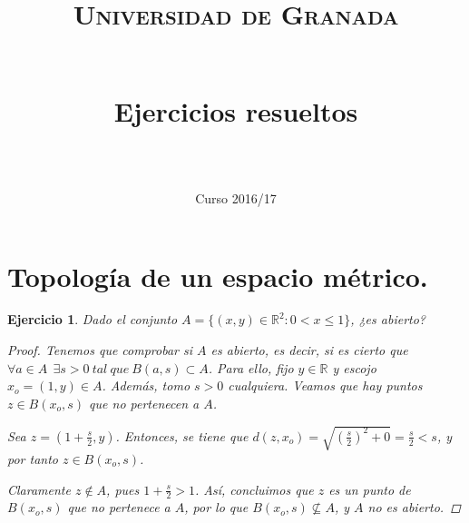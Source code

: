 \documentclass[11pt, a4paper, titlepage]{article}
\title{
  \normalfont \normalsize 
  \textsc{Universidad de Granada} \\ [25pt]    %
  \horrule{0.5pt} \\[0.4cm] %
  \huge \subject\\  \Large Ejercicios resueltos\\ %
  \horrule{2pt} \\[0.5cm] %
}
\author{\large{\docauthor}}
\date{\vspace{-1.5em} \normalsize Curso 2016/17}
\theoremstyle{exercise-style}
\newtheorem*{ejer}{Ejercicio}
\theoremstyle{theorem-style}
\begin{document}
\maketitle  %


\section{Topología de un espacio métrico.}

\begin{ejer}
Dado el conjunto $A = \{ (x,y)\in \mathbb{R}^2: 0 < x \le 1 \}$, ¿es abierto?

\begin{proof}
Tenemos que comprobar si $A$ es abierto, es decir, si es cierto que\\
$\forall a \in A \ \ \exists s>0\ tal\ que\ B(a,s)\subset A$. Para ello, fijo $y \in \mathbb{R}$ y escojo $x_o = (1,y) \in A$. Además, tomo $s>0$ cualquiera. Veamos que hay puntos $z \in B(x_o, s)$ que no pertenecen a $A$.

Sea $\displaystyle z = (1 + \frac{s}{2}, y)$. Entonces, se tiene que $\displaystyle d(z,x_o)= \sqrt{\left(\frac{s}{2}\right)^2 + 0} = \frac{s}{2} < s$, y por tanto $z \in B(x_o,s)$.

Claramente $z\notin A$, pues $\displaystyle 1 + \frac{s}{2} > 1$. Así, concluimos que $z$ es un punto de $B(x_o,s)$ que no pertenece a $A$, por lo que $\displaystyle B(x_o,s) \not \subseteq A$, y $A$ no es abierto. \qedhere

\end{proof}

\end{ejer}
\end{document}
